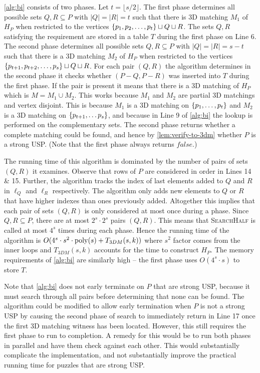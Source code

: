 \documentclass[11pt]{article}
\newcommand\sse{\subseteq}
\begin{document}
\autoref{alg:bi} consists of two phases. Let $t = \lfloor s/2 \rfloor$. The
first phase determines all possible sets $Q,R \sse P$ with $|Q| = |R|
= t$ such that there is 3D matching $M_1$ of $H_P$ when restricted to
the vertices $\left\{ p_1,p_2, \ldots, p_t \right\} \sqcup Q \sqcup R$.  The sets
$Q,R$ satisfying the requirement are stored in a table $T$ during the first
phase on Line 6.  The second phase determines all possible sets $Q,R
\sse P$ with $|Q| = |R| = s - t$ such that there is a 3D matching
$M_2$ of $H_P$ when restricted to the vertices
$\left\{ p_{t+1},p_{t+2},\ldots,p_s \right\} \sqcup Q \sqcup R$.  For each pair
$(Q,R)$ the algorithm determines in the second phase it checks whether
$(P - Q, P - R)$ was inserted into $T$ during the first phase.  If the
pair is present it means that there is a 3D matching of $H_P$ which is
$M = M_1 \cup M_2$.  This works because $M_1$ and $M_2$ are partial 3D
matchings and vertex disjoint.  This is because $M_1$ is a 3D matching
on $\left\{ p_1,\ldots,p_t \right\}$ and $M_2$ is a 3D matching on
$\left\{ p_{t+1},\ldots p_s \right\}$, and because in Line 9 of \autoref{alg:bi}
the lookup is performed on the complementary sets.  The second phase
returns whether a complete matching could be found, and hence by
\autoref{lem:verify-to-3dm} whether $P$ is a strong USP.  (Note that
the first phase always returns $false$.)

The running time of this algorithm is dominated by the number of
pairs of sets $(Q,R)$ it examines.  Observe that rows of $P$ are
considered in order in Lines 14 \& 15.  Further, the algorithm tracks
the index of last elements added to $Q$ and $R$ in $\ell_Q$ and
$\ell_R$ respectively.  The algorithm only adds new elements to $Q$ or
$R$ that have higher indexes than ones previously added.  Altogether
this implies that each pair of sets $(Q,R)$ is only considered at most
once during a phase.  Since $Q, R \sse P$, there are at most $2^s
\cdot 2^s$ pairs $(Q,R)$.  This means that \textsc{SearchHalf} is
called at most $4^s$ times during each phase.  Hence the running time
of the algorithm is $O(4^s \cdot s^2 \cdot \operatorname{poly}(s) + T_{3DM}(s,k))$
where $s^2$ factor comes from the inner loops and $T_{3DM}(s,k)$
accounts for the time to construct $H_P$.  The memory requirements of
\autoref{alg:bi} are similarly high -- the first phase uses $O(4^s
\cdot s)$ to store $T$.

Note that \autoref{alg:bi} does not early terminate on $P$ that are strong
USP, because it must search through all pairs before determining that
none can be found.  The algorithm could be modified to allow early
termination when $P$ is not a strong USP by causing the second phase
of search to immediately return in Line 17 once the first 3D matching
witness has been located.  However, this still requires the first
phase to run to completion.  A remedy for this would be to run both
phases in parallel and have them check against each other.  This would
substantially complicate the implementation, and not substantially
improve the practical running time for puzzles that are strong USP.
\end{document}
